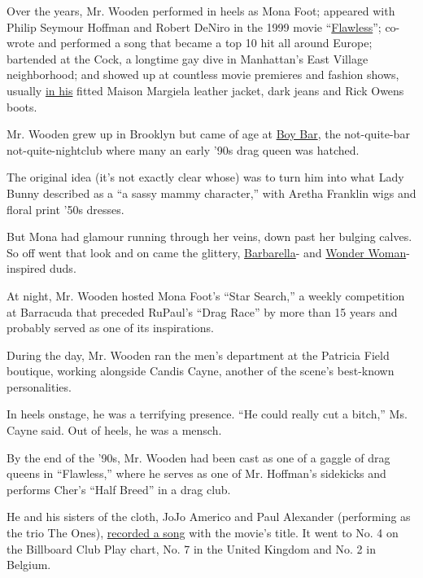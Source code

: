 Over the years, Mr. Wooden performed in heels as Mona Foot; appeared
with Philip Seymour Hoffman and Robert DeNiro in the 1999 movie
``\href{https://archive.nytimes.com/www.nytimes.com/library/film/112499flaw-film-review.html}{Flawless}'';
co-wrote and performed a song that became a top 10 hit all around
Europe; bartended at the Cock, a longtime gay dive in Manhattan's East
Village neighborhood; and showed up at countless movie premieres and
fashion shows, usually
\href{https://www.instagram.com/p/B-GGYGwjffJ/}{in his} fitted Maison
Margiela leather jacket, dark jeans and Rick Owens boots.

Mr. Wooden grew up in Brooklyn but came of age at
\href{https://www.nytimes.com/2018/06/20/style/new-york-gay-bars-that-are-gone.html}{Boy
Bar}, the not-quite-bar not-quite-nightclub where many an early '90s
drag queen was hatched.

The original idea (it's not exactly clear whose) was to turn him into
what Lady Bunny described as a ``a sassy mammy character,'' with Aretha
Franklin wigs and floral print '50s dresses.

But Mona had glamour running through her veins, down past her bulging
calves. So off went that look and on came the glittery,
\href{https://www.instagram.com/p/B-GA4r3pJjo/}{Barbarella}- and
\href{https://www.instagram.com/p/B-Fqtz4h62D/}{Wonder Woman}-inspired
duds.

At night, Mr. Wooden hosted Mona Foot's ``Star Search,'' a weekly
competition at Barracuda that preceded RuPaul's ``Drag Race'' by more
than 15 years and probably served as one of its inspirations.

During the day, Mr. Wooden ran the men's department at the Patricia
Field boutique, working alongside Candis Cayne, another of the scene's
best-known personalities.

In heels onstage, he was a terrifying presence. ``He could really cut a
bitch,'' Ms. Cayne said. Out of heels, he was a mensch.

By the end of the '90s, Mr. Wooden had been cast as one of a gaggle of
drag queens in ``Flawless,'' where he serves as one of Mr. Hoffman's
sidekicks and performs Cher's ``Half Breed'' in a drag club.

He and his sisters of the cloth, JoJo Americo and Paul Alexander
(performing as the trio The Ones),
\href{https://www.youtube.com/watch?v=O_e5oYqNRSM}{recorded a song} with
the movie's title. It went to No. 4 on the Billboard Club Play chart,
No. 7 in the United Kingdom and No. 2 in Belgium.

